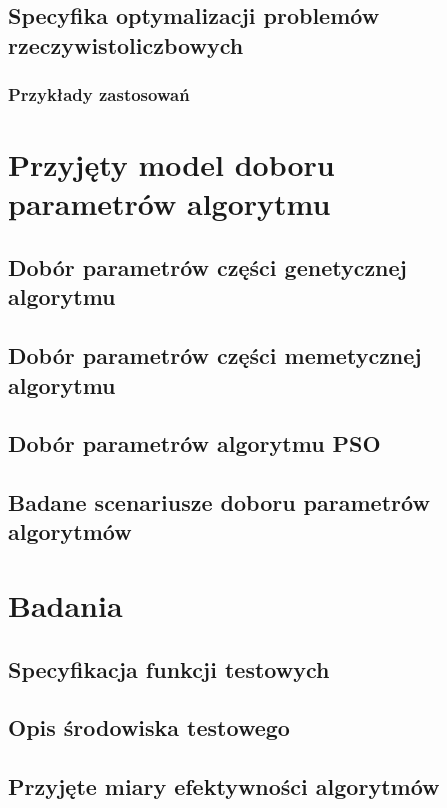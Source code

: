 \documentclass[a4paper,11pt]{article}
\begin{document}
\subsection{Specyfika optymalizacji problemów rzeczywistoliczbowych}

\subsubsection{Przykłady zastosowań}



\newpage
\section{Przyjęty model doboru parametrów algorytmu}

\subsection{Dobór parametrów części genetycznej algorytmu}

\subsection{Dobór parametrów części memetycznej algorytmu}

\subsection{Dobór parametrów algorytmu PSO}

\subsection{Badane scenariusze doboru parametrów algorytmów}

\newpage
\section{Badania}

\subsection{Specyfikacja funkcji testowych}

\subsection{Opis środowiska testowego}

\subsection{Przyjęte miary efektywności algorytmów}
\end{document}
